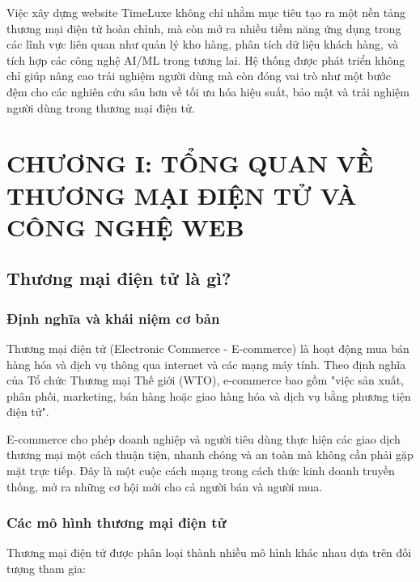 \documentclass[a4paper,12pt]{report}
\begin{document}
Việc xây dựng website TimeLuxe không chỉ nhằm mục tiêu tạo ra một nền tảng thương mại điện tử hoàn chỉnh, mà còn mở ra nhiều tiềm năng ứng dụng trong các lĩnh vực liên quan như quản lý kho hàng, phân tích dữ liệu khách hàng, và tích hợp các công nghệ AI/ML trong tương lai. Hệ thống được phát triển không chỉ giúp nâng cao trải nghiệm người dùng mà còn đóng vai trò như một bước đệm cho các nghiên cứu sâu hơn về tối ưu hóa hiệu suất, bảo mật và trải nghiệm người dùng trong thương mại điện tử.

\setcounter{chapter}{1} %
\chapter*{CHƯƠNG I: TỔNG QUAN VỀ THƯƠNG MẠI ĐIỆN TỬ VÀ CÔNG NGHỆ WEB}

\setcounter{section}{0} %
\renewcommand{\thesection}{\thechapter.\arabic{section}}

\section{Thương mại điện tử là gì?}

\subsection{Định nghĩa và khái niệm cơ bản}

Thương mại điện tử (Electronic Commerce - E-commerce) là hoạt động mua bán hàng hóa và dịch vụ thông qua internet và các mạng máy tính. Theo định nghĩa của Tổ chức Thương mại Thế giới (WTO), e-commerce bao gồm "việc sản xuất, phân phối, marketing, bán hàng hoặc giao hàng hóa và dịch vụ bằng phương tiện điện tử".

E-commerce cho phép doanh nghiệp và người tiêu dùng thực hiện các giao dịch thương mại một cách thuận tiện, nhanh chóng và an toàn mà không cần phải gặp mặt trực tiếp. Đây là một cuộc cách mạng trong cách thức kinh doanh truyền thống, mở ra những cơ hội mới cho cả người bán và người mua.

\subsection{Các mô hình thương mại điện tử}

Thương mại điện tử được phân loại thành nhiều mô hình khác nhau dựa trên đối tượng tham gia:
\end{document}
